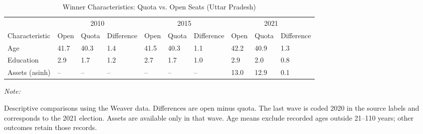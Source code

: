 \begin{table}
\centering
\caption{\label{tab:up_cand_char}Winner Characteristics: Quota vs. Open Seats (Uttar Pradesh)}
\centering
\fontsize{8}{10}\selectfont
\begin{threeparttable}
\begin{tabular}[t]{llllllllll}
\toprule
\multicolumn{1}{c}{ } & \multicolumn{3}{c}{2010} & \multicolumn{3}{c}{2015} & \multicolumn{3}{c}{2021} \\
\cmidrule(l{3pt}r{3pt}){2-4} \cmidrule(l{3pt}r{3pt}){5-7} \cmidrule(l{3pt}r{3pt}){8-10}
Characteristic & Open & Quota & Difference & Open & Quota & Difference & Open & Quota & Difference\\
\midrule
Age & 41.7 & 40.3 & 1.4 & 41.5 & 40.3 & 1.1 & 42.2 & 40.9 & 1.3\\
Education & 2.9 & 1.7 & 1.2 & 2.7 & 1.7 & 1.0 & 2.9 & 2.0 & 0.8\\
Assets (asinh) & -- & -- & -- & -- & -- & -- & 13.0 & 12.9 & 0.1\\
\bottomrule
\end{tabular}
\begin{tablenotes}
\item \textit{Note: } 
\item Descriptive comparisons using the Weaver data. Differences are open minus quota. The last wave is coded 2020 in the source labels and corresponds to the 2021 election. Assets are available only in that wave. Age means exclude recorded ages outside 21--110 years; other outcomes retain those records.
\end{tablenotes}
\end{threeparttable}
\end{table}
